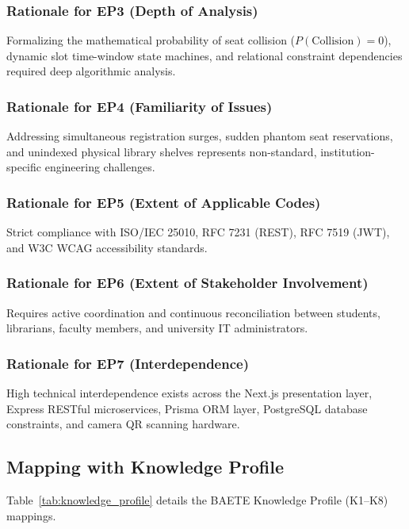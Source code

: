 \subsubsection{Rationale for EP3 (Depth of Analysis)}
Formalizing the mathematical probability of seat collision ($P(\text{Collision})=0$), dynamic slot time-window state machines, and relational constraint dependencies required deep algorithmic analysis.

\subsubsection{Rationale for EP4 (Familiarity of Issues)}
Addressing simultaneous registration surges, sudden phantom seat reservations, and unindexed physical library shelves represents non-standard, institution-specific engineering challenges.

\subsubsection{Rationale for EP5 (Extent of Applicable Codes)}
Strict compliance with ISO/IEC 25010, RFC 7231 (REST), RFC 7519 (JWT), and W3C WCAG accessibility standards.

\subsubsection{Rationale for EP6 (Extent of Stakeholder Involvement)}
Requires active coordination and continuous reconciliation between students, librarians, faculty members, and university IT administrators.

\subsubsection{Rationale for EP7 (Interdependence)}
High technical interdependence exists across the Next.js presentation layer, Express RESTful microservices, Prisma ORM layer, PostgreSQL database constraints, and camera QR scanning hardware.

\subsection{Mapping with Knowledge Profile}
Table~\ref{tab:knowledge_profile} details the BAETE Knowledge Profile (K1--K8) mappings.

